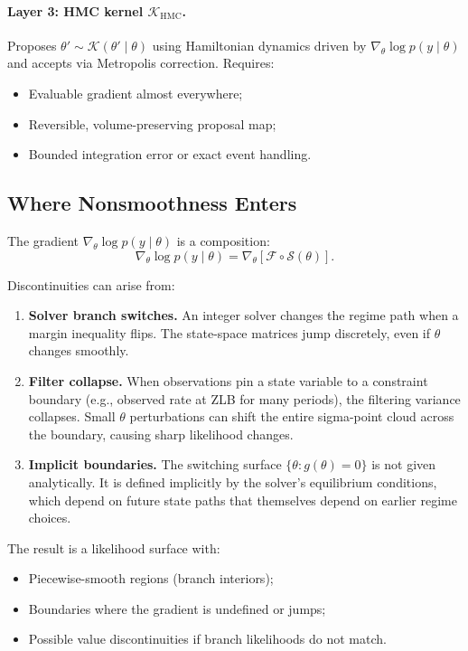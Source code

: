 \paragraph{Layer 3: HMC kernel $\mathcal{K}_{\text{HMC}}$.}
Proposes $\theta' \sim \mathcal{K}(\theta' \mid \theta)$ using Hamiltonian
dynamics driven by $\nabla_\theta \log p(y \mid \theta)$ and accepts via
Metropolis correction. Requires:
\begin{itemize}
  \item Evaluable gradient almost everywhere;
  \item Reversible, volume-preserving proposal map;
  \item Bounded integration error or exact event handling.
\end{itemize}

\subsection{Where Nonsmoothness Enters}

The gradient $\nabla_\theta \log p(y \mid \theta)$ is a composition:
\begin{equation}
  \nabla_\theta \log p(y \mid \theta)
  = \nabla_\theta \left[ \mathcal{F} \circ \mathcal{S}(\theta) \right].
  \label{eq:gradient-composition}
\end{equation}

Discontinuities can arise from:
\begin{enumerate}
  \item \textbf{Solver branch switches.} An integer solver changes the regime
    path when a margin inequality flips. The state-space matrices jump
    discretely, even if $\theta$ changes smoothly.
  \item \textbf{Filter collapse.} When observations pin a state variable to a
    constraint boundary (e.g., observed rate at ZLB for many periods), the
    filtering variance collapses. Small $\theta$ perturbations can shift the
    entire sigma-point cloud across the boundary, causing sharp likelihood
    changes.
  \item \textbf{Implicit boundaries.} The switching surface
    $\{\theta : g(\theta) = 0\}$ is not given analytically. It is defined
    implicitly by the solver's equilibrium conditions, which depend on future
    state paths that themselves depend on earlier regime choices.
\end{enumerate}

The result is a likelihood surface with:
\begin{itemize}
  \item Piecewise-smooth regions (branch interiors);
  \item Boundaries where the gradient is undefined or jumps;
  \item Possible value discontinuities if branch likelihoods do not match.
\end{itemize}

